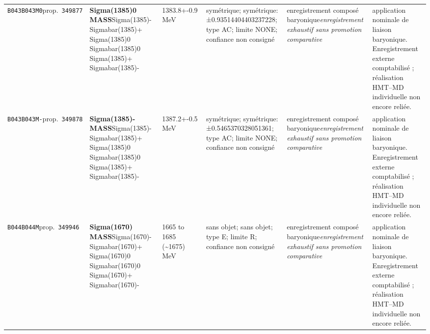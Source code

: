 \begin{landscape}
\begin{longtable}{L{1.85cm}L{4.45cm}L{2.35cm}L{4.05cm}L{3.35cm}L{7.15cm}}
\texttt{B043}\newline \texttt{B043M0}\newline prop.\ \texttt{349877} & \textbf{Sigma(1385)0 MASS}\newline Sigma(1385)- \textbar{}\allowbreak{} Sigmabar(1385)+ \textbar{}\allowbreak{} Sigma(1385)0 \textbar{}\allowbreak{} Sigmabar(1385)0 \textbar{}\allowbreak{} Sigma(1385)+ \textbar{}\allowbreak{} Sigmabar(1385)- & 1383.8+-0.9\,MeV & symétrique; symétrique: ±0.93514404403237228; type AC; limite NONE; confiance non consigné & enregistrement composé baryonique\newline \emph{enregistrement exhaustif sans promotion comparative} & application nominale de liaison baryonique. Enregistrement externe comptabilisé ; réalisation HMT--MD individuelle non encore reliée. \\
\texttt{B043}\newline \texttt{B043M-}\newline prop.\ \texttt{349878} & \textbf{Sigma(1385)- MASS}\newline Sigma(1385)- \textbar{}\allowbreak{} Sigmabar(1385)+ \textbar{}\allowbreak{} Sigma(1385)0 \textbar{}\allowbreak{} Sigmabar(1385)0 \textbar{}\allowbreak{} Sigma(1385)+ \textbar{}\allowbreak{} Sigmabar(1385)- & 1387.2+-0.5\,MeV & symétrique; symétrique: ±0.5465370328051361; type AC; limite NONE; confiance non consigné & enregistrement composé baryonique\newline \emph{enregistrement exhaustif sans promotion comparative} & application nominale de liaison baryonique. Enregistrement externe comptabilisé ; réalisation HMT--MD individuelle non encore reliée. \\
\texttt{B044}\newline \texttt{B044M}\newline prop.\ \texttt{349946} & \textbf{Sigma(1670) MASS}\newline Sigma(1670)- \textbar{}\allowbreak{} Sigmabar(1670)+ \textbar{}\allowbreak{} Sigma(1670)0 \textbar{}\allowbreak{} Sigmabar(1670)0 \textbar{}\allowbreak{} Sigma(1670)+ \textbar{}\allowbreak{} Sigmabar(1670)- & 1665 to 1685 (\textasciitilde{}1675)\,MeV & sans objet; sans objet; type E; limite R; confiance non consigné & enregistrement composé baryonique\newline \emph{enregistrement exhaustif sans promotion comparative} & application nominale de liaison baryonique. Enregistrement externe comptabilisé ; réalisation HMT--MD individuelle non encore reliée. \\

\end{longtable}
\end{landscape}
